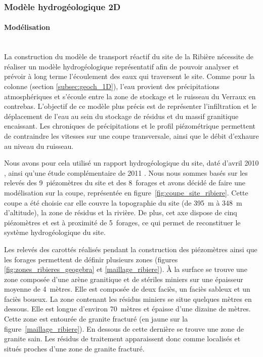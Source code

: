 \documentclass{article}
\begin{document}
\subsubsection{Modèle hydrogéologique 2D}
\paragraph{Modélisation \\ \\}
\label{page:modele_hydro}
La construction du modèle de transport réactif du site de la Ribière nécessite de réaliser un modèle hydrogéologique représentatif afin de pouvoir analyser et prévoir à long terme l'écoulement des eaux qui traversent le site. 
Comme pour la colonne (section \ref{subsec:geoch_1D}), l'eau provient des précipitations atmosphériques et s'écoule entre la zone de stockage et le ruisseau du Verraux en contrebas. L'objectif de ce modèle plus précis est de représenter l'infiltration et le déplacement de l'eau au sein du stockage de résidus et du massif granitique encaissant. Les chroniques de précipitations et le profil piézométrique permettent de contraindre les vitesses sur une coupe transversale, ainsi que le débit d'exhaure au niveau du ruisseau.

Nous avons pour cela utilisé un rapport hydrogéologique du site, daté d'avril 2010 \cite{societe_areva_nc_etude_2010}, ainsi qu'une étude complémentaire de 2011 \cite{societe_areva_nc_etude_2011}. Nous nous sommes basés sur les relevés des 9~piézomètres du site et des 8~forages et avons décidé de faire une modélisation sur la coupe,  représentée en figure~\ref{fig:coupe_site_ribiere}.
Cette coupe a été choisie car elle couvre la topographie du site (de 395~m à 348~m d'altitude), la zone de résidus et la rivière. De plus, cet axe dispose de cinq piézomètres et est à proximité de 5~forages, ce qui permet de reconstituer le système hydrogéologique du site.

Les relevés des carottés réalisés pendant la construction des piézomètres ainsi que les forages permettent de définir plusieurs zones (figures \ref{fig:zones_ribieres_geogebra} et \ref{maillage_ribiere}). À la surface se trouve une zone composée d’une arène granitique et de stériles miniers sur une épaisseur moyenne de 4~mètres. Elle est composée de deux faciès, un faciès sableux et un faciès boueux. La zone contenant les résidus miniers se situe quelques mètres en dessous. Elle est longue d'environ 70~mètres et épaisse d'une dizaine de mètres. Cette zone est entourée de granite fracturé (en jaune sur la figure~\ref{maillage_ribiere}). En dessous de cette dernière se trouve une zone de granite sain. Les résidus de traitement apparaissent donc comme localisés et situés proches d’une zone de granite fracturé. 
\end{document}
